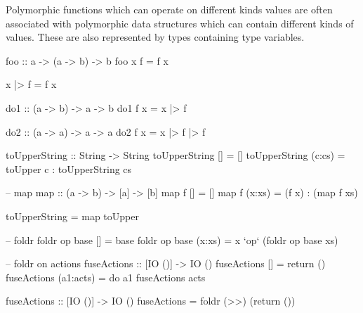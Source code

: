 Polymorphic functions which can operate on different kinds values are often associated with polymorphic 
data structures which can contain different kinds of values. 
These are also represented by types containing type variables.

\begin{haskellcode}
foo :: a -> (a -> b) -> b
foo x f = f x

x |> f = f x

do1 :: (a -> b) -> a -> b
do1 f x = x |> f

do2 :: (a -> a) -> a -> a
do2 f x = x |> f |> f
\end{haskellcode}


\begin{haskellcode}
toUpperString :: String -> String
toUpperString [] = []
toUpperString (c:cs) = toUpper c : toUpperString cs

-- map
map :: (a -> b) -> [a] -> [b]
map f [] = []
map f (x:xs) = (f x) : (map f xs)

toUpperString = map toUpper

-- foldr
foldr op base [] = base
foldr op base (x:xs) = x `op` (foldr op base xs)

-- foldr on actions
fuseActions :: [IO ()] -> IO ()
fuseActions []        = return ()
fuseActions (a1:acts) = do a1
                           fuseActions acts

fuseActions :: [IO ()] -> IO ()
fuseActions = foldr (>>) (return ())
\end{haskellcode}




